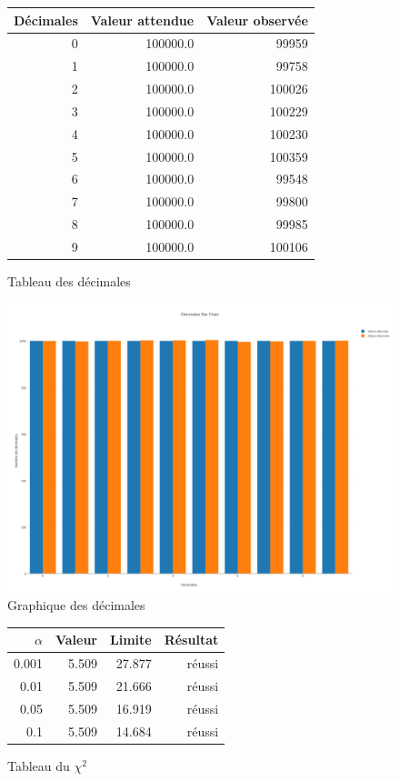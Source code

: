 \documentclass[10pt,a4paper]{article}
\begin{document}
	\begin{figure}[h]
		\centering
		\begin{tabular}{|r|r|r|}
			\hline
			Décimales & Valeur attendue & Valeur observée\\
			\hline
			0 & 100000.0 & 99959\\
			1 & 100000.0 & 99758\\
			2 & 100000.0 & 100026\\
			3 & 100000.0 & 100229\\
			4 & 100000.0 & 100230\\
			5 & 100000.0 & 100359\\
			6 & 100000.0 & 99548\\
			7 & 100000.0 & 99800\\
			8 & 100000.0 & 99985\\
			9 & 100000.0 & 100106\\
			\hline
		\end{tabular}
		\caption{Tableau des décimales}
	\end{figure}
	
	\begin{figure}[h]
		\centering
		\includegraphics[scale=0.25]{../chart_images/decimales_bar_chart.png}
		\caption{Graphique des décimales}
	\end{figure}
	
	\begin{figure}[h]
		\centering
		\begin{tabular}{|r|r|r|r|}
			\hline
			$\alpha$ & Valeur & Limite & Résultat\\
			\hline
			0.001 & 5.509 & 27.877 & réussi\\
			0.01 & 5.509 & 21.666 & réussi\\
			0.05 & 5.509 & 16.919 & réussi\\
			0.1 & 5.509 & 14.684 & réussi\\
			\hline
		\end{tabular}
		\caption{Tableau du $\chi^2$}
	\end{figure}
	
\end{document}
